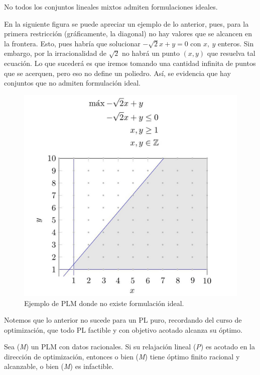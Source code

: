 \begin{obs}No todos los conjuntos lineales mixtos admiten formulaciones ideales. \end{obs}

En la siguiente figura se puede apreciar un ejemplo de lo anterior, pues, para la primera restricción (gráficamente, la diagonal) no hay valores que se alcancen en la frontera. Esto, pues habría que solucionar $-\sqrt2 x+y=0$ con $x,\ y$ enteros. Sin embargo, por la irracionalidad de $\sqrt2$ no habrá un punto $(x,y)$ que resuelva tal ecuación. Lo que sucederá es que iremos tomando una cantidad infinita de puntos que se acerquen, pero eso no define un poliedro. Así, se evidencia que hay conjuntos que no admiten formulación ideal. 
\begin{figure}[H]
    \centering
    \includegraphics[scale=0.18]{Imagen1.jpg}
    \caption{Ejemplo de PLM donde no existe formulación ideal.}
    \label{fig:NoExistenceIdeal}
\end{figure}

Notemos que lo anterior no sucede para un PL puro, recordando del curso de optimización, que todo PL factible y con objetivo acotado alcanza su óptimo.

\begin{teo}
Sea (\textit{M}) un PLM con datos racionales. Si su relajación lineal (\textit{P}) es acotado en la dirección de optimización, entonces o bien (\textit{M}) tiene óptimo finito racional y alcanzable, o bien (\textit{M}) es infactible.
\end{teo}

